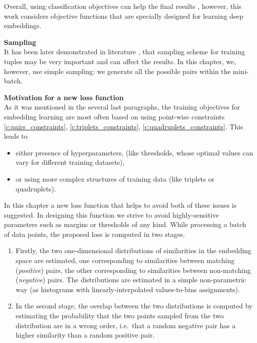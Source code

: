 Overall, using classification objectives can help the final results \citep{Sun14}, however, this work considers objective functions that are specially designed for learning deep embeddings. 

\bigskip\indent\textbf{Sampling}\\
It has been later demonstrated in literature \citep{sohn2016improved, wu2017sampling}, that sampling scheme for training tuples may be very important and can affect the results. In this chapter, we, however, use simple sampling: we generate all the possible pairs within the mini-batch.




\bigskip\textbf{Motivation for a new loss function}\\
As it was mentioned in the several last paragraphs, the training objectives for embedding learning are most often based on using point-wise constraints \ref{c:pairs_constraints}, \ref{c:triplets_constraints}, \ref{c:quadruplets_constraints}. 
This leads to 
\begin{itemize}
    \item either presence of hyperparameters, (like thresholds, whose optimal values can vary for different training datasets),
    \item or using more complex structures of training data (like triplets or quadruplets).
\end{itemize}  

In this chapter a new loss function that helps to avoid both of these issues is suggested. In designing this function we strive to avoid highly-sensitive parameters such as margins or thresholds of any kind. While processing a batch of data points, the proposed loss is computed in two stages. 
\begin{enumerate}
\item Firstly, the two one-dimensional distributions of similarities in the embedding space are estimated, one corresponding to similarities between matching (\textit{positive}) pairs, the other corresponding to similarities between non-matching (\textit{negative}) pairs. The distributions are estimated in a simple non-parametric way (as histograms with linearly-interpolated values-to-bins assignments).
\item In the second stage, the overlap between the two distributions is computed by estimating the probability that the two points sampled from the two distribution are in a wrong order, i.e.\ that a random negative pair has a higher similarity than a random positive pair.
\end{enumerate}

